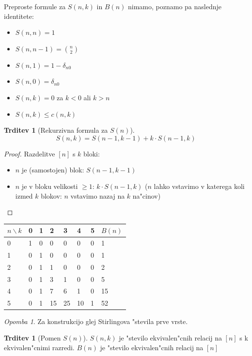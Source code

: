 \documentclass[a4paper,12pt]{article}
\theoremstyle{definition}
\newtheorem{claim}[counter]{Trditev}
\theoremstyle{remark}
\newtheorem*{rem}{Opomba}
\begin{document}
Preproste formule za $S(n,k)$ in $B(n)$ nimamo, poznamo pa naslednje identitete:
\begin{itemize}
	\item $S(n,n) = 1$
	\item $S(n,n-1) = \binom{n}{2}$
	\item $S(n,1) = 1 - \delta_{n0}$
	\item $S(n,0) = \delta_{n0}$
	\item $S(n,k) = 0$ za $k < 0$ ali $k > n$
	\item $S(n,k) \leq c(n,k)$
\end{itemize}

\begin{claim}[Rekurzivna formula za $S(n)$]
    \[S(n, k) = S(n-1, k-1) + k \cdot S(n-1, k)\]
\end{claim}

\begin{proof}
    Razdelitve $[n]$ s $k$ bloki:
    \begin{itemize}
        \item $n$ je (samostojen) blok: $S(n-1, k-1)$
        \item $n$ je v bloku velikosti $\geq 1$: $k \cdot S(n-1, k)$ ($n$ lahko vstavimo v katerega koli izmed $k$ blokov: $n$ vstavimo nazaj na $k$ na"cinov)
    \end{itemize}
\end{proof}

\begin{center}
	\begin{tabular}{l|llllll|l}
	    $n \backslash k$ & 0 & 1  & 2  & 3  & 4  & 5 & $B(n)$ \\
	    \hline
	    0 & 1 & 0  & 0  & 0  & 0  & 0 & 1 \\
	    1 & 0 & 1  & 0  & 0  & 0  & 0 & 1 \\
	    2 & 0 & 1  & 1  & 0  & 0  & 0 & 2 \\
	    3 & 0 & 1  & 3  & 1  & 0  & 0 & 5 \\
	    4 & 0 & 1  & 7  & 6  & 1  & 0 & 15 \\
	    5 & 0 & 1  & 15 & 25 & 10 & 1 & 52
	\end{tabular}
\end{center}

\begin{rem}
	Za konstrukcijo glej Stirlingova "stevila prve vrste.
\end{rem}

\begin{claim}[Pomen $S(n)$]
    $S(n,k)$ je "stevilo ekvivalen"cnih relacij na $[n]$ s k ekvivalen"cnimi razredi. $B(n)$ je "stevilo ekvivalen"cnih relacij na $[n]$
\end{claim}
\end{document}
